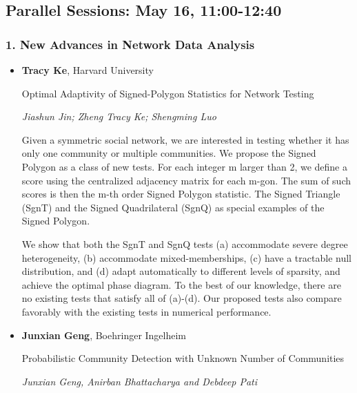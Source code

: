 
\subsection*{Parallel Sessions: May 16, 11:00-12:40}

\subsubsection*{1. New Advances in Network Data Analysis}

\begin{itemize}
\item \textbf{Tracy Ke}, Harvard University

Optimal Adaptivity of Signed-Polygon Statistics for Network Testing

\emph{\footnotesize Jiashun Jin; Zheng Tracy Ke; Shengming Luo}

Given a symmetric social network, we are interested in testing whether it has only one community or multiple  communities.  We propose the Signed Polygon as a class of new tests. For each integer m larger than 2, we define a score using the centralized adjacency matrix for each m-gon. The sum of such scores is then the m-th order Signed Polygon statistic. The Signed Triangle (SgnT) and the Signed Quadrilateral (SgnQ) as special examples of the Signed Polygon.  


We show that both the SgnT and SgnQ tests (a) accommodate severe degree heterogeneity, (b) accommodate mixed-memberships, (c) have a tractable null distribution, and (d)  adapt automatically to different levels of sparsity, and achieve the optimal phase diagram. To the best of our knowledge, there are no existing tests that satisfy all of (a)-(d). Our proposed tests also compare favorably with the existing tests in numerical performance.  


\item \textbf{Junxian Geng}, Boehringer Ingelheim

Probabilistic Community Detection with Unknown Number of Communities

\emph{\footnotesize Junxian Geng, Anirban Bhattacharya and Debdeep Pati}


\end{itemize}
